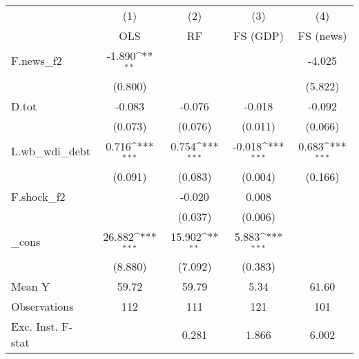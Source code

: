 {
\def\sym#1{\ifmmode^{#1}\else\(^{#1}\)\fi}
\begin{tabular}{l*{4}{c}}
\toprule
            &\multicolumn{1}{c}{(1)}&\multicolumn{1}{c}{(2)}&\multicolumn{1}{c}{(3)}&\multicolumn{1}{c}{(4)}\\
            &\multicolumn{1}{c}{OLS}&\multicolumn{1}{c}{RF}&\multicolumn{1}{c}{FS (GDP)}&\multicolumn{1}{c}{FS (news)}\\
\midrule
F.news\_f2   &      -1.890\sym{**} &                     &                     &      -4.025         \\
            &     (0.800)         &                     &                     &     (5.822)         \\
\addlinespace
D.tot       &      -0.083         &      -0.076         &      -0.018         &      -0.092         \\
            &     (0.073)         &     (0.076)         &     (0.011)         &     (0.066)         \\
\addlinespace
L.wb\_wdi\_debt&       0.716\sym{***}&       0.754\sym{***}&      -0.018\sym{***}&       0.683\sym{***}\\
            &     (0.091)         &     (0.083)         &     (0.004)         &     (0.166)         \\
\addlinespace
F.shock\_f2  &                     &      -0.020         &       0.008         &                     \\
            &                     &     (0.037)         &     (0.006)         &                     \\
\addlinespace
\_cons      &      26.882\sym{***}&      15.902\sym{**} &       5.883\sym{***}&                     \\
            &     (8.880)         &     (7.092)         &     (0.383)         &                     \\
\midrule
Mean Y      &       59.72         &       59.79         &        5.34         &       61.60         \\
Observations&         112         &         111         &         121         &         101         \\
Exc. Inst. F-stat&                     &       0.281         &       1.866         &       6.002         \\
\bottomrule
\end{tabular}
}
